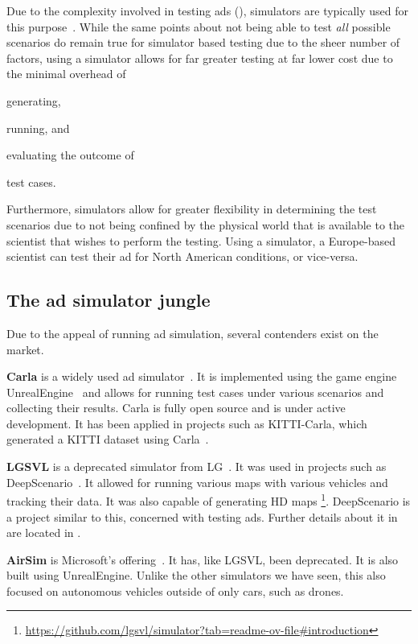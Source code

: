 Due to the complexity involved in testing \acrlong{ads} (),
simulators are typically used for this purpose~\cite{DeepScenario}. While the same points about not
being able to test \textit{all} possible scenarios do remain true for simulator based testing due to
the sheer number of factors, using a simulator allows for far greater testing at far lower cost due
to the minimal overhead of
\begin{inparaenum}
    \item generating,
    \item running, and
    \item evaluating the outcome of
\end{inparaenum}
test cases.

Furthermore, simulators allow for greater flexibility in determining the test scenarios due to not
being confined by the  physical world that is available to the scientist that wishes to perform the
testing. Using a simulator, a Europe-based scientist can test their \acrshort{ad} for North American
conditions, or vice-versa.

\subsection{The \acrshort{ad} simulator jungle}\label{sec:simulatorOverview}

Due to the appeal of running \acrshort{ad} simulation, several contenders exist
on the market.

\textbf{Carla} is a widely used \acrshort{ad} simulator~\cite{Carla}. It is implemented
using the game engine UnrealEngine~\cite{unrealengine} and allows for running
test cases under various scenarios and collecting their results. Carla is fully
open source and is under active development. It has been applied in projects such as KITTI-Carla,
which generated a KITTI dataset using Carla~\cite{kittiCarla}.

\textbf{LGSVL} is a deprecated simulator from LG~\cite{lgsvl}. It was used in projects such
as DeepScenario~\cite{DeepScenario}. It allowed for running various maps with various vehicles and
tracking their data. It was also capable of generating HD
maps \footnote{\url{https://github.com/lgsvl/simulator?tab=readme-ov-file\#introduction}}.
DeepScenario is a project similar to this, concerned with testing \acrlong{ads}. Further details
about it in are located in .

\textbf{AirSim} is Microsoft's offering~\cite{airsim}. It has, like LGSVL,
been deprecated. It is also built using UnrealEngine. Unlike the other
simulators we have seen, this also focused on autonomous vehicles outside of
only cars, such as drones.


